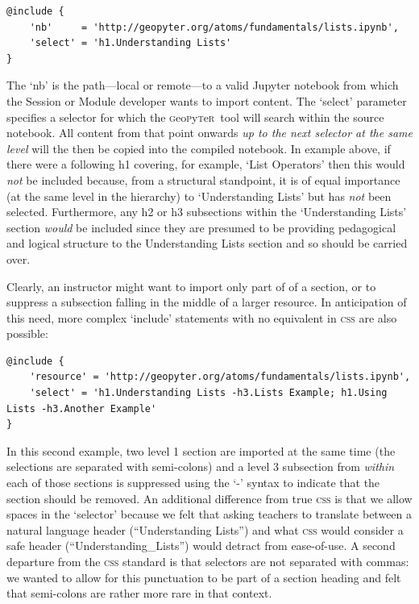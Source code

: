 \documentclass[letter, 11pt]{article}
\newcommand{\gp}{\textsc{g}eo\textsc{p}y\textsc{t}e\textsc{r}~\/}
\begin{document}
\begin{Verbatim}[fontsize=\small]
@include {
    'nb'     = 'http://geopyter.org/atoms/fundamentals/lists.ipynb',
    'select' = 'h1.Understanding Lists'
}
\end{Verbatim}

The `nb' is the path---local or remote---to a valid Jupyter notebook from which the Session or Module developer wants to import content. The `select' parameter specifies a selector for which the \gp tool will search within the source notebook. All content from that point onwards \emph{up to the next selector at the same level} will the then be copied into the compiled notebook. In example above, if there were a following h1 covering, for example, `List Operators' then this would \emph{not} be included because, from a structural standpoint, it is of equal importance (at the same level in the hierarchy) to `Understanding Lists' but has \emph{not} been selected. Furthermore, any h2 or h3 subsections within the `Understanding Lists' section \textit{would} be included since they are presumed to be providing pedagogical and logical structure to the Understanding Lists section and so should be carried over. 

Clearly, an instructor might want to import only part of of a section, or to suppress a subsection falling in the middle of a larger resource. In anticipation of this need, more complex `include' statements with no equivalent in \textsc{css} are also possible:

\begin{Verbatim}[fontsize=\small]
@include {
    'resource' = 'http://geopyter.org/atoms/fundamentals/lists.ipynb',
    'select' = 'h1.Understanding Lists -h3.Lists Example; h1.Using Lists -h3.Another Example'
}
\end{Verbatim}

In this second example, two level 1 section are imported at the same time (the selections are separated with semi-colons) and a level 3 subsection from \emph{within} each of those sections is suppressed using the `-' syntax to indicate that the section should be removed. An additional difference from true \textsc{css} is that we allow spaces in the `selector' because we felt that asking teachers to translate between a natural language header (``Understanding Lists'') and what \textsc{css} would consider a safe header (``Understanding\_Lists'') would detract from ease-of-use. A second departure from the \textsc{css} standard is that selectors are not separated with commas: we wanted to allow for this punctuation to be part of a section heading and felt that semi-colons are rather more rare in that context.
\end{document}

